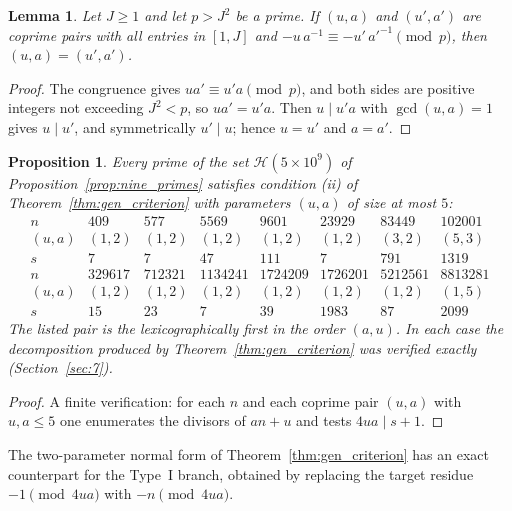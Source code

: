 \documentclass[11pt, a4paper]{article}
\theoremstyle{plain}
\newtheorem{lemma}[theorem]{Lemma}
\newtheorem{proposition}[theorem]{Proposition}
\theoremstyle{definition}
\begin{document}
\begin{lemma}\label{lem:distinct_classes}
Let $J\ge1$ and let $p>J^{2}$ be a prime. If $(u,a)$ and $(u',a')$ are coprime pairs with all entries in $[1,J]$ and $-u\,a^{-1}\equiv-u'\,a'^{-1}\pmod p$, then $(u,a)=(u',a')$.
\end{lemma}
\begin{proof}
The congruence gives $ua'\equiv u'a\pmod p$, and both sides are positive integers not exceeding $J^{2}<p$, so $ua'=u'a$. Then $u\mid u'a$ with $\gcd(u,a)=1$ gives $u\mid u'$, and symmetrically $u'\mid u$; hence $u=u'$ and $a=a'$.
\end{proof}

\begin{proposition}\label{prop:nine_resolved}
Every prime of the set $\mathcal{H}(5\times10^{9})$ of Proposition~\ref{prop:nine_primes} satisfies condition (ii) of Theorem~\ref{thm:gen_criterion} with parameters $(u,a)$ of size at most $5$:
$$
\begin{array}{lccccccc}
n & 409 & 577 & 5569 & 9601 & 23929 & 83449 & 102001\\
(u,a) & (1,2) & (1,2) & (1,2) & (1,2) & (1,2) & (3,2) & (5,3)\\
s & 7 & 7 & 47 & 111 & 7 & 791 & 1319\\[6pt]
n & 329617 & 712321 & 1134241 & 1724209 & 1726201 & 5212561 & 8813281\\
(u,a) & (1,2) & (1,2) & (1,2) & (1,2) & (1,2) & (1,2) & (1,5)\\
s & 15 & 23 & 7 & 39 & 1983 & 87 & 2099
\end{array}
$$
The listed pair is the lexicographically first in the order $(a,u)$. In each case the decomposition produced by Theorem~\ref{thm:gen_criterion} was verified exactly (Section~\ref{sec:7}).
\end{proposition}
\begin{proof}
A finite verification: for each $n$ and each coprime pair $(u,a)$ with $u,a\le5$ one enumerates the divisors of $an+u$ and tests $4ua\mid s+1$.
\end{proof}

The two-parameter normal form of Theorem~\ref{thm:gen_criterion} has an exact counterpart for the Type~I branch, obtained by replacing the target residue $-1\pmod{4ua}$ with $-n\pmod{4ua}$.
\end{document}
